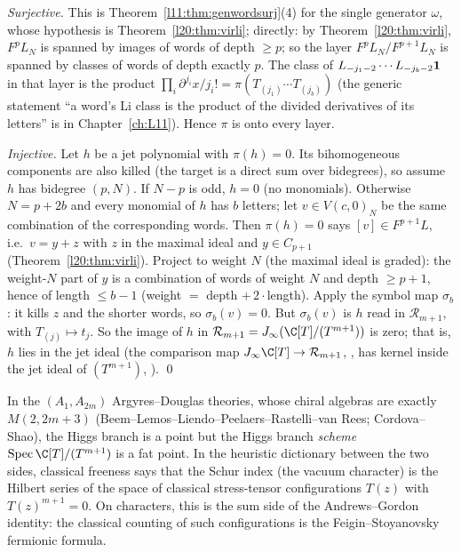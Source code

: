 \emph{Surjective.} This is Theorem~\ref{l11:thm:genwordsurj}(4) for the single generator $\omega$, whose hypothesis is
Theorem~\ref{l20:thm:virli}; directly: by Theorem~\ref{l20:thm:virli}, $F^pL_N$ is spanned by images of words of depth $\ge p$; so the layer
$F^pL_N/F^{p+1}L_N$ is spanned by classes of words of depth exactly $p$. The class of
$L_{-j_1-2}\cdots L_{-j_b-2}\mathbf{1}$ in that layer is the product $\prod_i\partial^{j_i}x/j_i!=\pi(T_{(j_1)}\cdots T_{(j_b)})$
(the generic statement ``a word's Li class is the product of the divided derivatives of its letters'' is in
Chapter~\ref{ch:L11}). Hence $\pi$ is onto every layer.

\emph{Injective.} Let $h$ be a jet polynomial with $\pi(h)=0$. Its bihomogeneous components are also killed (the target is
a direct sum over bidegrees), so assume $h$ has bidegree $(p,N)$. If $N-p$ is odd, $h=0$ (no monomials). Otherwise $N=p+2b$ and every
monomial of $h$ has $b$ letters; let $v\in V(c,0)_N$ be the same combination of the corresponding words. Then $\pi(h)=0$ says
$[v]\in F^{p+1}L$, i.e.\ $v=y+z$ with $z$ in the maximal ideal and $y\in C_{p+1}$ (Theorem~\ref{l20:thm:virli}). Project to weight
$N$ (the maximal ideal is graded): the weight-$N$ part of $y$ is a combination of words of weight $N$ and depth $\ge p+1$, hence of
length $\le b-1$ (weight $=$ depth $+\,2\cdot$length). Apply the symbol map $\sigma_b$: it kills $z$ and the shorter words, so
$\sigma_b(v)=0$. But $\sigma_b(v)$ is $h$ read in $\mathcal R_{m+1}$, with $T_{(j)}\mapsto t_j$. So the image of $h$ in
$\mathcal R_{m+1}=\ltwentyJ(\C[T]/(T^{m+1}))$ is zero; that is, $h$ lies in the jet ideal (the comparison map
$\ltwentyJ\C[T]\to \mathcal R_{m+1}$, , has kernel inside the jet ideal of $(T^{m+1})$, ). \qed

\begin{physics}
In the $(A_1,A_{2m})$ Argyres--Douglas theories, whose chiral algebras are exactly $M(2,2m+3)$ (Beem--Lemos--Liendo--Peelaers--Rastelli--van
Rees; Cordova--Shao), the Higgs branch is a point but the Higgs branch \emph{scheme} $\operatorname{Spec}\C[T]/(T^{m+1})$ is a fat point.
In the heuristic dictionary between the two sides, classical freeness says that the Schur index (the vacuum character) is the
Hilbert series of the space of classical stress-tensor configurations $T(z)$ with $T(z)^{m+1}=0$. On characters, this is the sum side of the
Andrews--Gordon identity: the classical counting of such configurations is the Feigin--Stoyanovsky fermionic formula.
\end{physics}

